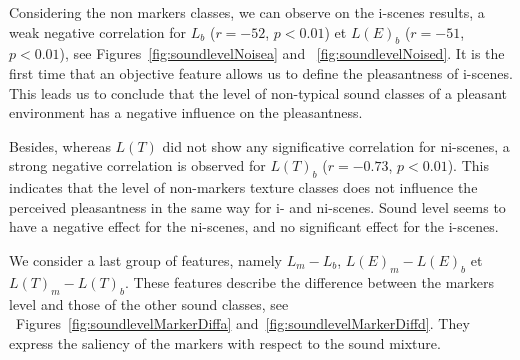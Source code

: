 \documentclass[preprint,12pt]{elsarticle}
\newcommand{\cf}{cf.}
\begin{document}
Considering the non markers classes, we can observe on the i-scenes results, a weak negative correlation for $L_b$  ($r=-52$, $p<0.01$) et $L(E)_b$ ($r=-51$, $p<0.01$), see Figures~\ref{fig:soundlevelNoisea}  and ~\ref{fig:soundlevelNoised}. It is the first time that an objective feature allows us to define the pleasantness of i-scenes. This leads us to conclude that the level of non-typical sound classes of a pleasant environment has a negative influence on the pleasantness.


Besides, whereas $L(T)$ did not show any significative correlation for ni-scenes, a strong negative correlation is observed for $L(T)_b$ ($r = -0.73$, $p < 0.01$). This indicates that the level of non-markers texture classes does not influence the perceived pleasantness in the same way for i- and ni-scenes. Sound level seems to have a negative effect for the ni-scenes, and no significant effect for the i-scenes.


We consider a last group of features, namely $L_m-L_b$, $L(E)_m-L(E)_b$ et $L(T)_m-L(T)_b$.  These features describe the difference between the markers level and those of the other sound classes, see ~Figures~\ref{fig:soundlevelMarkerDiffa} and~\ref{fig:soundlevelMarkerDiffd}. They express the saliency of the markers with respect to the sound mixture.

\end{document}
